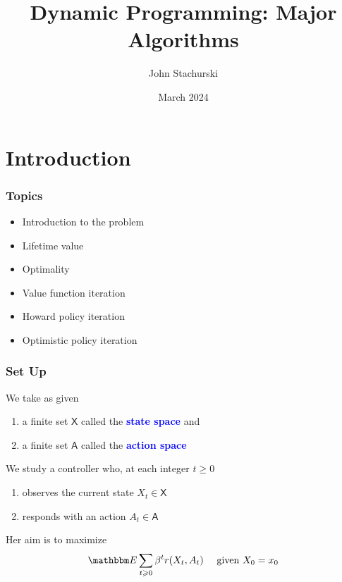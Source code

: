 \documentclass[xcolor=dvipsnames]{beamer}
\date[\today]{}
\title{Dynamic Programming: Major Algorithms}
\author{John Stachurski}
\date{March 2024}
\renewcommand{\geq}{\geqslant}
\newcommand{\navy}[1]{\textcolor{Blue}{\bf #1}}
\newcommand{\EE}{\mathbbm E}
\newcommand{\Asf}{\mathsf A}
\newcommand{\Xsf}{\mathsf X}
\renewcommand{\geq}{\geqslant}
\newcommand{\1}{\mathbbm 1}
\begin{document}
\begin{frame}
  \titlepage
\end{frame}


\section{Introduction}

\begin{frame}
    \frametitle{Topics}

    \begin{itemize}
        \item Introduction to the problem
        \vspace{0.5em}
        \item Lifetime value
        \vspace{0.5em}
        \item Optimality
        \vspace{0.5em}
        \item Value function iteration
        \vspace{0.5em}
        \item Howard policy iteration
        \vspace{0.5em}
        \item Optimistic policy iteration
    \end{itemize}

\end{frame}




\begin{frame}
    \frametitle{Set Up}

    We take as given 
    \begin{enumerate}
        \item a finite set $\Xsf$ called the \navy{state space} and
    \vspace{0.5em}
        \item a finite set $\Asf$ called the \navy{action space}
    \end{enumerate}
     
    \vspace{0.5em}
    We study a controller who, at each integer $t \geq 0$
    \begin{enumerate}
        \item observes the current state $X_t \in \Xsf$
    \vspace{0.5em}
        \item responds with an action $A_t \in \Asf$
    \end{enumerate}

    \vspace{0.5em}
    \vspace{0.5em}
    \vspace{0.5em}
    Her aim is to maximize 
    \begin{equation*}\label{eq:dmdp_ob}
        \EE \sum_{t \geq 0} \beta^t r(X_t, A_t)
        \quad \text{ given } X_0 = x_0 
    \end{equation*}


\end{frame}
\end{document}
